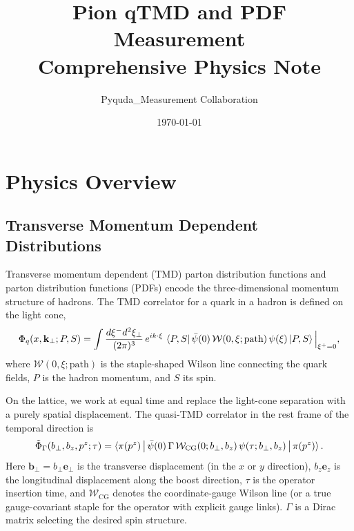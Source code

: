 \documentclass[11pt,a4paper]{article}
\title{Pion qTMD and PDF Measurement\\Comprehensive Physics Note}
\author{Pyquda\_Measurement Collaboration}
\date{\today}
\begin{document}
\maketitle
\tableofcontents

\section{Physics Overview}
\label{sec:overview}

\subsection{Transverse Momentum Dependent Distributions}

Transverse momentum dependent (TMD) parton distribution functions and parton
distribution functions (PDFs) encode the three-dimensional momentum structure of
hadrons.  The TMD correlator for a quark in a hadron is defined on the light
cone,
\begin{equation}
  \Phi_{q}(x, \mathbf{k}_\perp; P, S)
  =
  \int \frac{d\xi^- d^2\xi_\perp}{(2\pi)^3}\,
  e^{i k\cdot\xi}\,
  \braket{P, S|\,
    \bar\psi(0)\, \mathcal{W}(0,\xi;\text{path})\, \psi(\xi)
  \,|P, S}
  \Big|_{\xi^+=0},
\end{equation}
where $\mathcal{W}(0,\xi;\text{path})$ is the staple-shaped Wilson line
connecting the quark fields, $P$ is the hadron momentum, and $S$ its spin.

On the lattice, we work at equal time and replace the light-cone separation
with a purely spatial displacement.  The quasi-TMD correlator in the
rest frame of the temporal direction is
\begin{equation}
  \tilde\Phi_{\Gamma}(b_\perp, b_z, p^z; \tau)
  =
  \braket{
    \pi(p^z)\,\big|\,
    \bar\psi(0)\,\Gamma\,
    \mathcal{W}_{\text{CG}}(0; b_\perp, b_z)\,\psi(\tau; b_\perp, b_z)
    \,\big|\,\pi(p^z)
  }.
\end{equation}
Here $\mathbf{b}_\perp = b_\perp\mathbf{e}_\perp$ is the transverse displacement
(in the $x$ or $y$ direction), $b_z\mathbf{e}_z$ is the longitudinal
displacement along the boost direction, $\tau$ is the operator insertion time,
and $\mathcal{W}_{\text{CG}}$ denotes the coordinate-gauge Wilson line (or a
true gauge-covariant staple for the operator with explicit gauge links).
$\Gamma$ is a Dirac matrix selecting the desired spin structure.
\end{document}
